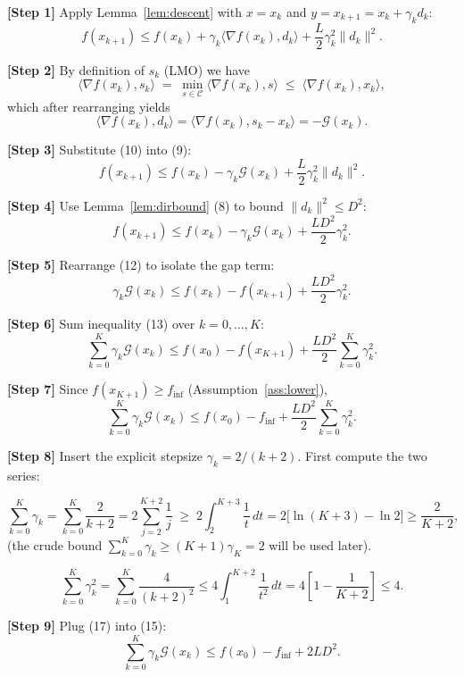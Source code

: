 \documentclass{article}
\newcommand{\C}{\mathcal{C}}
\begin{document}
\noindent\textbf{[Step 1]} Apply Lemma~\ref{lem:descent} with $x=x_{k}$ and $y=x_{k+1}=x_{k}+\gamma_{k}d_{k}$:
\[
f(x_{k+1})
\le f(x_{k})+\gamma_{k}\langle\nabla f(x_{k}),d_{k}\rangle
      +\frac{L}{2}\gamma_{k}^{2}\|d_{k}\|^{2}.
\tag{9}
\]

\noindent\textbf{[Step 2]} By definition of $s_{k}$ (LMO) we have
\[
\langle\nabla f(x_{k}),s_{k}\rangle
\;=\;\min_{s\in\C}\langle\nabla f(x_{k}),s\rangle
\;\le\;\langle\nabla f(x_{k}),x_{k}\rangle,
\]
which after rearranging yields
\[
\langle\nabla f(x_{k}),d_{k}\rangle
=\langle\nabla f(x_{k}),s_{k}-x_{k}\rangle
= -\mathcal{G}(x_{k}).
\tag{10}
\]

\noindent\textbf{[Step 3]} Substitute (10) into (9):
\[
f(x_{k+1})
\le f(x_{k})-\gamma_{k}\mathcal{G}(x_{k})
      +\frac{L}{2}\gamma_{k}^{2}\|d_{k}\|^{2}.
\tag{11}
\]

\noindent\textbf{[Step 4]} Use Lemma~\ref{lem:dirbound} (8) to bound $\|d_{k}\|^{2}\le D^{2}$:
\[
f(x_{k+1})
\le f(x_{k})-\gamma_{k}\mathcal{G}(x_{k})
      +\frac{L D^{2}}{2}\gamma_{k}^{2}.
\tag{12}
\]

\noindent\textbf{[Step 5]} Rearrange (12) to isolate the gap term:
\[
\gamma_{k}\mathcal{G}(x_{k})
\le f(x_{k})-f(x_{k+1})
      +\frac{L D^{2}}{2}\gamma_{k}^{2}.
\tag{13}
\]

\noindent\textbf{[Step 6]} Sum inequality (13) over $k=0,\dots,K$:
\[
\sum_{k=0}^{K}\gamma_{k}\mathcal{G}(x_{k})
\le f(x_{0})-f(x_{K+1})
     +\frac{L D^{2}}{2}\sum_{k=0}^{K}\gamma_{k}^{2}.
\tag{14}
\]

\noindent\textbf{[Step 7]} Since $f(x_{K+1})\ge f_{\inf}$ (Assumption~\ref{ass:lower}),
\[
\sum_{k=0}^{K}\gamma_{k}\mathcal{G}(x_{k})
\le f(x_{0})-f_{\inf}
     +\frac{L D^{2}}{2}\sum_{k=0}^{K}\gamma_{k}^{2}.
\tag{15}
\]

\noindent\textbf{[Step 8]} Insert the explicit stepsize $\gamma_{k}=2/(k+2)$.  
First compute the two series:

\[
\sum_{k=0}^{K}\gamma_{k}
= \sum_{k=0}^{K}\frac{2}{k+2}
= 2\!\sum_{j=2}^{K+2}\frac{1}{j}
\;\ge\;2\!\int_{2}^{K+3}\frac{1}{t}\,dt
=2\bigl[\ln(K+3)-\ln 2\bigr]
\ge \frac{2}{K+2},
\tag{16}
\]
(the crude bound $\sum_{k=0}^{K}\gamma_{k}\ge (K+1)\gamma_{K}=2$ will be used later).

\[
\sum_{k=0}^{K}\gamma_{k}^{2}
= \sum_{k=0}^{K}\frac{4}{(k+2)^{2}}
\le 4\!\int_{1}^{K+2}\frac{1}{t^{2}}\,dt
=4\!\left[1-\frac{1}{K+2}\right]
\le 4.
\tag{17}
\]

\noindent\textbf{[Step 9]} Plug (17) into (15):
\[
\sum_{k=0}^{K}\gamma_{k}\mathcal{G}(x_{k})
\le f(x_{0})-f_{\inf}+2L D^{2}.
\tag{18}
\]
\end{document}
